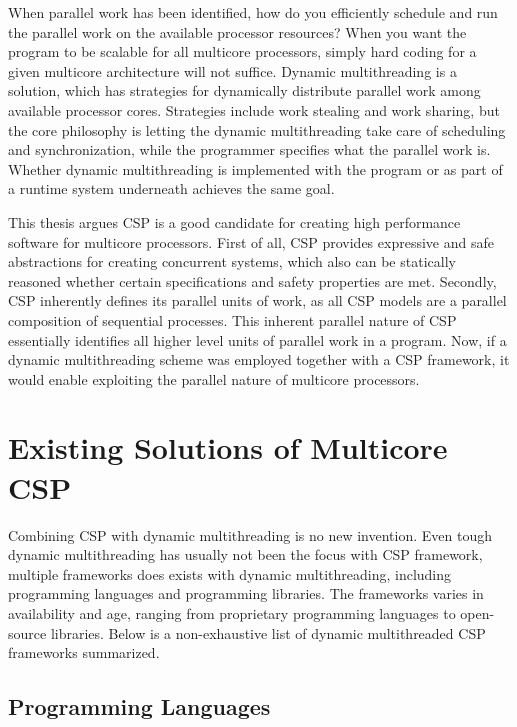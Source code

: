 When parallel work has been identified, how do you efficiently schedule and run the parallel work on the available processor resources? When you want the program to be scalable for all multicore processors, simply hard coding for a given multicore architecture will not suffice. Dynamic multithreading is a solution, which has strategies for dynamically distribute parallel work among available processor cores. Strategies include work stealing and work sharing, but the core philosophy is letting the dynamic multithreading take care of scheduling and synchronization, while the programmer specifies what the parallel work is. Whether dynamic multithreading is implemented with the program or as part of a runtime system underneath achieves the same goal. 

This thesis argues CSP is a good candidate for creating high performance software for multicore processors. First of all, CSP provides expressive and safe abstractions for creating concurrent systems, which also can be statically reasoned whether certain specifications and safety properties are met. Secondly, CSP inherently defines its parallel units of work, as all CSP models are a parallel composition of sequential processes. This inherent parallel nature of CSP essentially identifies all higher level units of parallel work in a program. Now, if a dynamic multithreading scheme was employed together with a CSP framework, it would enable exploiting the parallel nature of multicore processors.


\section{Existing Solutions of Multicore CSP}
\label{sec:multicore_csp_existing}


Combining CSP with dynamic multithreading is no new invention. Even tough dynamic multithreading has usually not been the focus with CSP framework, multiple frameworks does exists with dynamic multithreading, including programming languages and programming libraries. The frameworks varies in availability and age, ranging from proprietary programming languages to open\hyp{}source libraries. Below is a non\hyp{}exhaustive list of dynamic multithreaded CSP frameworks summarized.


\subsection{Programming Languages}


